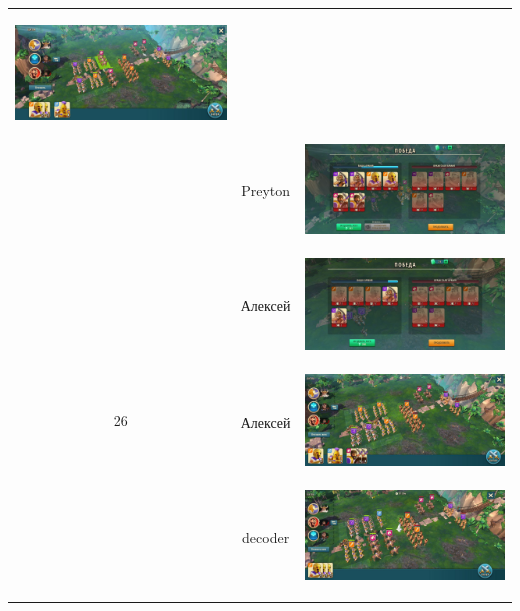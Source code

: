 \begin{longtable}{|c|c|c|}
	\hypertarget{fight26}{\includegraphics[width=0.75\linewidth]{./parts/media/TreasureHunt/26/Preyton/26.jpg}} \\
	& Preyton &
	\includegraphics[width=0.75\linewidth]{./parts/media/TreasureHunt/26/Preyton/26..jpg} \\
	\hline
	\multirow{6}{*}{26} & Алексей &
	\hypertarget{fight26}{\includegraphics[width=0.75\linewidth]{./parts/media/TreasureHunt/26/alexey/photo_2022-04-07_10-09-39.jpg}} \\
	& Алексей &
	\includegraphics[width=0.75\linewidth]{./parts/media/TreasureHunt/26/alexey/photo_2022-04-07_10-09-28.jpg} \\
	\hline
	\multirow{6}{*}{26} & decoder &
	\hypertarget{fight26}{\includegraphics[width=0.75\linewidth]{./parts/media/TreasureHunt/26/decoder/photo_2022-04-06_18-11-14.jpg}} \\

\end{longtable}

